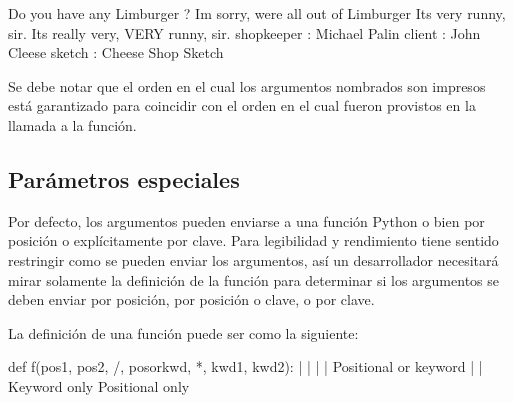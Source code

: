 \documentclass[a4,10pt,spanish]{sphinxmanual}
\begin{document}
\begin{sphinxVerbatim}[commandchars=\\\{\}]
\PYGZhy{}\PYGZhy{} Do you have any Limburger ?
\PYGZhy{}\PYGZhy{} I\PYGZsq{}m sorry, we\PYGZsq{}re all out of Limburger
It\PYGZsq{}s very runny, sir.
It\PYGZsq{}s really very, VERY runny, sir.
\PYGZhy{}\PYGZhy{}\PYGZhy{}\PYGZhy{}\PYGZhy{}\PYGZhy{}\PYGZhy{}\PYGZhy{}\PYGZhy{}\PYGZhy{}\PYGZhy{}\PYGZhy{}\PYGZhy{}\PYGZhy{}\PYGZhy{}\PYGZhy{}\PYGZhy{}\PYGZhy{}\PYGZhy{}\PYGZhy{}\PYGZhy{}\PYGZhy{}\PYGZhy{}\PYGZhy{}\PYGZhy{}\PYGZhy{}\PYGZhy{}\PYGZhy{}\PYGZhy{}\PYGZhy{}\PYGZhy{}\PYGZhy{}\PYGZhy{}\PYGZhy{}\PYGZhy{}\PYGZhy{}\PYGZhy{}\PYGZhy{}\PYGZhy{}\PYGZhy{}
shopkeeper : Michael Palin
client : John Cleese
sketch : Cheese Shop Sketch
\end{sphinxVerbatim}

\sphinxAtStartPar
Se debe notar que el orden en el cual los argumentos nombrados son impresos está garantizado para coincidir con el orden en el cual fueron provistos en la llamada a la función.


\subsection{Parámetros especiales}
\label{\detokenize{tutorial/controlflow:special-parameters}}
\sphinxAtStartPar
Por defecto, los argumentos pueden enviarse a una función Python o bien por posición o explícitamente por clave. Para legibilidad y rendimiento tiene sentido restringir como se pueden enviar los argumentos, así un desarrollador necesitará mirar solamente la definición de la función para determinar si los argumentos se deben enviar por posición, por posición o clave, o por clave.

\sphinxAtStartPar
La definición de una función puede ser como la siguiente:

\begin{sphinxVerbatim}[commandchars=\\\{\}]
def f(pos1, pos2, /, pos\PYGZus{}or\PYGZus{}kwd, *, kwd1, kwd2):
      \PYGZhy{}\PYGZhy{}\PYGZhy{}\PYGZhy{}\PYGZhy{}\PYGZhy{}\PYGZhy{}\PYGZhy{}\PYGZhy{}\PYGZhy{}\PYGZhy{}    \PYGZhy{}\PYGZhy{}\PYGZhy{}\PYGZhy{}\PYGZhy{}\PYGZhy{}\PYGZhy{}\PYGZhy{}\PYGZhy{}\PYGZhy{}     \PYGZhy{}\PYGZhy{}\PYGZhy{}\PYGZhy{}\PYGZhy{}\PYGZhy{}\PYGZhy{}\PYGZhy{}\PYGZhy{}\PYGZhy{}
        |             |                  |
        |        Positional or keyword   |
        |                                \PYGZhy{} Keyword only
         \PYGZhy{}\PYGZhy{} Positional only
\end{sphinxVerbatim}
\end{document}
